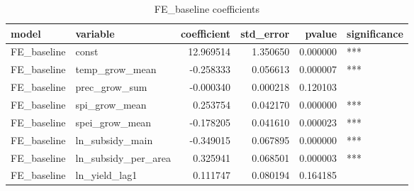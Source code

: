 \begin{table}
\caption{FE_baseline coefficients}
\label{tab:FE_baseline_coef}
\begin{tabular}{llrrrl}
\toprule
model & variable & coefficient & std_error & pvalue & significance \\
\midrule
FE_baseline & const & 12.969514 & 1.350650 & 0.000000 & *** \\
FE_baseline & temp_grow_mean & -0.258333 & 0.056613 & 0.000007 & *** \\
FE_baseline & prec_grow_sum & -0.000340 & 0.000218 & 0.120103 &  \\
FE_baseline & spi_grow_mean & 0.253754 & 0.042170 & 0.000000 & *** \\
FE_baseline & spei_grow_mean & -0.178205 & 0.041610 & 0.000023 & *** \\
FE_baseline & ln_subsidy_main & -0.349015 & 0.067895 & 0.000000 & *** \\
FE_baseline & ln_subsidy_per_area & 0.325941 & 0.068501 & 0.000003 & *** \\
FE_baseline & ln_yield_lag1 & 0.111747 & 0.080194 & 0.164185 &  \\
\bottomrule
\end{tabular}
\end{table}
